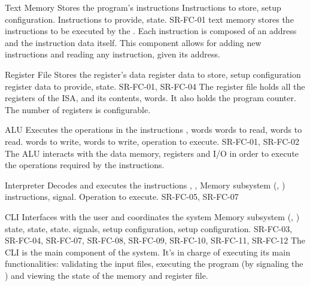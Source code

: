\begin{component}{Text Memory}
  {Stores the program's instructions}  %
  {\NA}  %
  {Instructions to store, setup configuration.}  %
  {Instructions to provide, state.}  %
  {SR-FC-01}  %
  \Gls{text memory} stores the instructions to be executed by the . Each instruction is composed of an address and the instruction data itself. This component allows for adding new instructions and reading any instruction, given its address.
\end{component}

\begin{component}{Register File}
  {Stores the \gls{register}'s data}  %
  {\NA}  %
  {\Gls{register} data to store, setup configuration}  %
  {\Gls{register} data to provide, state.}  %
  {SR-FC-01, SR-FC-04}  %
  The \gls{register} file holds all the \glspl{register} of the \gls{ISA}, and its contents, \glspl{word}. It also holds the \gls{program counter}. The number of registers is configurable.
\end{component}

\begin{component}{ALU}
  {Executes the operations in the instructions}  %
  {,  words}  %
  { words to read,  words to read.}  %
  { words to write,  words to write, operation to execute.}  %
  {SR-FC-01, SR-FC-02}  %
  The \gls{ALU} interacts with the \gls{data memory}, \glspl{register} and \gls{I/O} in order to execute the operations required by the instructions.
\end{component}

\begin{component}{Interpreter}
  {Decodes and executes the instructions}  %
  {, , Memory subsystem (, )}  %
  { instructions,  signal.}  %
  {Operation to execute.}  %
  {SR-FC-05, SR-FC-07}  %
\end{component}

\begin{component}{CLI}
  {Interfaces with the user and coordinates the system}  %
  {Memory subsystem (, )}  %
  { state,  state,  state.}  %
  { signals,  setup configuration,  setup configuration.}  %
  {SR-FC-03, SR-FC-04, SR-FC-07, SR-FC-08, SR-FC-09, SR-FC-10, SR-FC-11, SR-FC-12}  %
  The \gls{CLI} is the main component of the system. It's in charge of executing its main functionalities: validating the input files, executing the program (by signaling the ) and viewing the state of the memory and register file.
\end{component}

